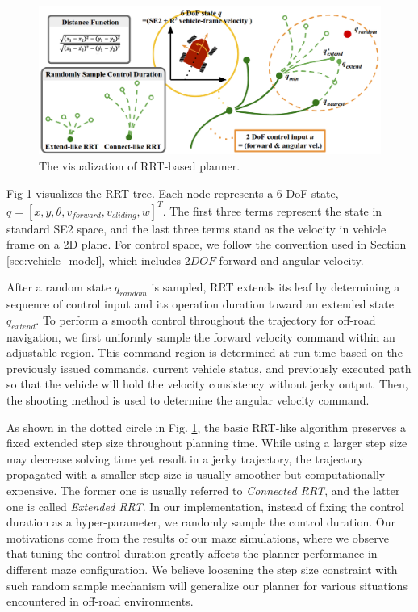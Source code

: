 \documentclass[../thesis.tex]{subfiles}
\begin{document}
\begin{figure}[t]
    	\begin{center}
    	 \centerline{\includegraphics[width=0.8\columnwidth]{./RRTPlanner/fig/rrt.png}}
           	\caption{The visualization of RRT-based planner.}
           	\label{fig:rrt}
    	\end{center}
\end{figure}
 
Fig \ref{fig:rrt} visualizes the RRT tree. 
Each node represents a $6$ DoF state, $q=[x,y, \theta ,v_{forward}, v_{sliding}, w]^T$. 
The first three terms represent the state in standard SE2 space, and the last three terms stand as the velocity in vehicle frame on a 2D plane. 
For control space, we follow the convention used in Section \ref{sec:vehicle_model}, which includes $2DOF$ forward and angular velocity.
 
After a random state $q_{random}$ is sampled, RRT extends its leaf by determining a sequence of control input and its operation duration toward an extended state $q_{extend}$.
To perform a smooth control throughout the trajectory for off-road navigation, we first uniformly sample the forward velocity command within an adjustable region.
This command region is determined at run-time based on the previously issued commands, current vehicle status, and previously executed path so that the vehicle will hold the velocity consistency without jerky output.
Then, the shooting method is used to determine the angular velocity command.
 
As shown in the dotted circle in Fig. \ref{fig:rrt}, the basic RRT-like algorithm preserves a fixed extended step size throughout planning time.
While using a larger step size may decrease solving time yet result in a jerky trajectory, the trajectory propagated with a smaller step size is usually smoother but computationally expensive.
The former one is usually referred to \textit{Connected RRT}, and the latter one is called \textit{Extended RRT}.
In our implementation, instead of fixing the control duration as a hyper-parameter, we randomly sample the control duration.
Our motivations come from the results of our maze simulations, where we observe that tuning the control duration greatly affects the planner performance in different maze configuration.
We believe loosening the step size constraint with such random sample mechanism will generalize our planner for various situations encountered in off-road environments.
 
\end{document}
